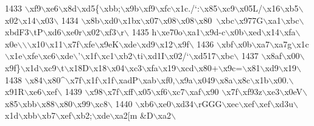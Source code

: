 \begin{DoxyCode}
1433 \textcolor{stringliteral}{\(\backslash\)xf9\(\backslash\)xe6\(\backslash\)x8d\(\backslash\)xd5\{\(\backslash\)xbb;\(\backslash\)x9b\(\backslash\)xf9\(\backslash\)xfc\(\backslash\)x1c./`:\(\backslash\)x85\(\backslash\)xc9\(\backslash\)x05L/\(\backslash\)x16\(\backslash\)xb5\(\backslash\)x02\(\backslash\)x14\(\backslash\)x03\(\backslash\)}
1434 \textcolor{stringliteral}{\(\backslash\)x8b\(\backslash\)xd0\(\backslash\)x1bx\(\backslash\)x07\(\backslash\)x08\(\backslash\)x08\(\backslash\)x80~\(\backslash\)xbc\(\backslash\)x977G\(\backslash\)xa1\(\backslash\)xbc\(\backslash\)xbdF3\(\backslash\)tP\(\backslash\)xd6\(\backslash\)xe0r\(\backslash\)x02\(\backslash\)xf3\(\backslash\)r\(\backslash\)}
1435 \textcolor{stringliteral}{h\(\backslash\)xe70o\(\backslash\)xa1\(\backslash\)x9d-c\(\backslash\)x0b\(\backslash\)xed\(\backslash\)x14\(\backslash\)xfa\(\backslash\)x0e\(\backslash\)\(\backslash\)\(\backslash\)x10\(\backslash\)x11\(\backslash\)x7f\(\backslash\)xfe\(\backslash\)x9eK\(\backslash\)xde\(\backslash\)xd9\(\backslash\)x12\(\backslash\)x9f\(\backslash\)}
1436 \textcolor{stringliteral}{\(\backslash\)xbf\(\backslash\)x0b\(\backslash\)xa7\(\backslash\)xa7g\(\backslash\)x1c\(\backslash\)x1e\(\backslash\)xfe\(\backslash\)xc6\(\backslash\)xde\(\backslash\)'\(\backslash\)x1f\(\backslash\)xc1\(\backslash\)xb2\(\backslash\)ti\(\backslash\)xd1I\(\backslash\)x02/`\(\backslash\)xd517\(\backslash\)xbc\(\backslash\)}
1437 \textcolor{stringliteral}{\(\backslash\)x8af\(\backslash\)x00\(\backslash\)x9f\}\(\backslash\)x1d\(\backslash\)xc9\(\backslash\)t\(\backslash\)x18D\(\backslash\)x18\(\backslash\)x04\(\backslash\)xc3\(\backslash\)xfa\(\backslash\)x19\(\backslash\)xcd\(\backslash\)x80+\(\backslash\)x9c=\(\backslash\)x81\(\backslash\)xd9\(\backslash\)x19\(\backslash\)}
1438 \textcolor{stringliteral}{\(\backslash\)x84\(\backslash\)x80^\(\backslash\)x7f\(\backslash\)x1f\(\backslash\)x1f\(\backslash\)xadP\(\backslash\)xab\(\backslash\)xf0,\(\backslash\)x9a\(\backslash\)x049\(\backslash\)x8a\(\backslash\)x8c\(\backslash\)x1b\(\backslash\)x00.\(\backslash\)x91R\(\backslash\)xe6\(\backslash\)xef\(\backslash\)}
1439 \textcolor{stringliteral}{\(\backslash\)x98\(\backslash\)x7f\(\backslash\)xff\(\backslash\)x05\(\backslash\)xf6\(\backslash\)xc7\(\backslash\)xaf\(\backslash\)x90 \(\backslash\)x7f\(\backslash\)xf93z\(\backslash\)xe3\(\backslash\)x0eV\(\backslash\)x85\(\backslash\)xbb\(\backslash\)x88\(\backslash\)x80\(\backslash\)x99\(\backslash\)xc8\(\backslash\)}
1440 \textcolor{stringliteral}{\(\backslash\)xb6\(\backslash\)xe0\(\backslash\)xd34\(\backslash\)rGGG\(\backslash\)xec\(\backslash\)xef\(\backslash\)xef\(\backslash\)xd3u\(\backslash\)x1d\(\backslash\)xbb\(\backslash\)xb7\(\backslash\)xef\(\backslash\)xb2;\(\backslash\)xde\(\backslash\)xa2[m &D\(\backslash\)xa2\(\backslash\)}

\end{DoxyCode}
